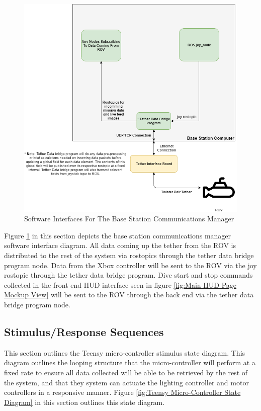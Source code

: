 \documentclass{scrreprt}
\begin{document}
\begin{figure}[!ht]
    \centering
    \includegraphics[scale=0.45]{ROVBaseStationCommsManager.png}
    \caption{Software Interfaces For The Base Station Communications Manager}
    \label{fig:Software Interface Base Station Communications Manager}
\end{figure}
\FloatBarrier

Figure \ref{fig:Software Interface Base Station Communications Manager} in this section depicts the base station communications manager software interface diagram. All data coming up the tether from the ROV is distributed to the rest of the system via rostopics through the tether data bridge program node. Data from the Xbox controller will be sent to the ROV via the joy rostopic through the tether data bridge program. Dive start and stop commands collected in the front end HUD interface seen in figure \ref{fig:Main HUD Page Mockup View} will be sent to the ROV through the back end via the tether data bridge program node.   



\subsection{Stimulus/Response Sequences}
This section outlines the Teensy micro-controller stimulus state diagram. This diagram outlines the looping structure that the micro-controller will perform at a fixed rate to ensure all data collected will be able to be retrieved by the rest of the system, and that they system can actuate the lighting controller and motor controllers in a responsive manner. Figure \ref{fig:Teensy Micro-Controller State Diagram} in this section outlines this state diagram.
\end{document}
